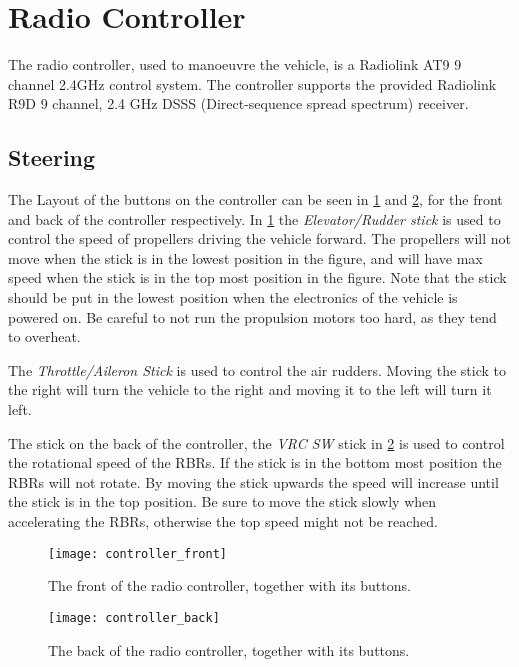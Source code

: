 \section{Radio Controller}
The radio controller, used to manoeuvre the vehicle, is a Radiolink AT9 9 channel
2.4GHz control system. The controller supports the provided Radiolink R9D
9 channel, 2.4 GHz DSSS (Direct-sequence spread spectrum) receiver.

\subsection{Steering}
The Layout of the buttons on the controller can be seen in
\cref{fig:controller_front} and \cref{fig:controller_back}, for the front and
back of the controller respectively. In \cref{fig:controller_front} the
\textit{Elevator/Rudder stick} is used to control the speed of propellers
driving the vehicle forward. The propellers will not move when the stick is in the
lowest position in the figure, and will have max speed when the stick is in the
top most position in the figure. Note that the stick should be put in the
lowest position when the electronics of the vehicle is powered on. Be careful to not run the propulsion motors too hard, as they tend to overheat.

The \textit{Throttle/Aileron Stick} is used to control the air rudders. Moving
the stick to the right will turn the vehicle to the right and moving it to the
left will turn it left.

The stick on the back of the controller, the \textit{VRC SW} stick in
\cref{fig:controller_back} is used to control the rotational speed of the RBRs.
If the stick is in the bottom most position the RBRs will not rotate. By moving
the stick upwards the speed will increase until the stick is in the top
position. Be sure to move the stick slowly when accelerating the RBRs, otherwise the top speed might not be reached. 

\begin{figure}[h]
   \centering
   \texttt{[image: controller\_front]}
   \caption{The front of the radio controller, together with its buttons.}
   \label{fig:controller_front}
\end{figure}

\begin{figure}[h]
   \centering
   \texttt{[image: controller\_back]}
   \caption{The back of the radio controller, together with its buttons.}
   \label{fig:controller_back}
\end{figure}

